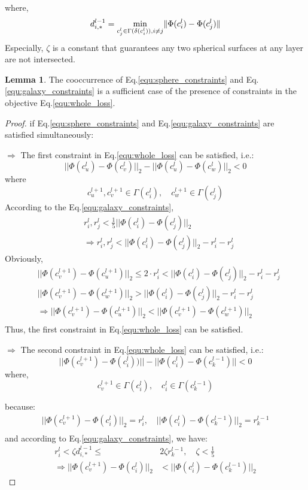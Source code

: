 \documentclass{article}
\theoremstyle{definition}
\newtheorem{lem}{Lemma}
\begin{document}
	 where,
	 \[
	 	d_{i,*}^{l-1} = \min_{c^{l}_j \in \Gamma(\delta(c^{l}_i)), i \neq j} \lVert\Phi(c_i^{l}) - \Phi(c_j^{l})\rVert \\
	 \]
	 Especially, $\zeta$ is a constant that guarantees any two spherical surfaces at any layer are not intersected.

	 \begin{lem}
	 \label{lem:constraints}
	 The cooccurrence of Eq.\ref{equ:sphere_constraints} and Eq.\ref{equ:galaxy_constraints} is a sufficient case of the presence of constraints in the objective Eq.\ref{equ:whole_loss}.
	 \end{lem}
	 \begin{proof}
	 	if Eq.\ref{equ:sphere_constraints} and Eq.\ref{equ:galaxy_constraints} are satisfied simultaneously:

	 	$\Rightarrow$ The first constraint in Eq.\ref{equ:whole_loss} can be satisfied, i.e.:
	 	\[
	 		|| \Phi(c_u^l) - \Phi(c_v^l) ||_2 - ||\Phi(c_u^l) - \Phi(c_w^l)||_2 < 0 	
	 	\]
	 	where 
	 	\[
	 		c_u^{l+1}, c_v^{l+1} \in \Gamma{(c_i^l)}, \quad c_w^{l+1} \in \Gamma{(c_j^l)}
	 	\]
	 	According to the Eq.\ref{equ:galaxy_constraints},
	 \[
	 	\begin{split}
	 	&r_i^l, r_j^l < \frac{1}{5}||\Phi(c_i^{l}) - \Phi(c_j^{l})||_2 \\
	 	&\Rightarrow r_i^l, r_j^l < ||\Phi(c_i^{l}) - \Phi(c_j^{l})||_2-r_i^l-r_j^l
	 	\end{split}
	 \]
	 Obviously,
	 \[
	 \begin{split}
	 &||\Phi(c_v^{l+1}) - \Phi(c_u^{l+1})||_2 \le 2 \cdot r_i^l < ||\Phi(c_i^{l}) - \Phi(c_j^{l})||_2-r_i^l-r_j^l \\
	 &||\Phi(c_v^{l+1}) - \Phi(c_w^{l+1})||_2 > ||\Phi(c_i^{l}) - \Phi(c_j^{l})||_2-r_i^l-r_j^l\\
	 &\Rightarrow ||\Phi(c_v^{l+1}) - \Phi(c_u^{l+1})||_2 < ||\Phi(c_v^{l+1}) - \Phi(c_w^{l+1})||_2\\
	 \end{split}
	 \]
	 Thus, the first constraint in Eq.\ref{equ:whole_loss} can be satisfied.

	 $\Rightarrow$ The second constraint in Eq.\ref{equ:whole_loss} can be satisfied, i.e.:
	 \[
	 	|| \Phi(c_v^{l+1}) - \Phi(c_i^{l})) || - ||\Phi(c_i^{l}) - \Phi(c_k^{l - 1})|| < 0
	 \]
	 where, 
	 \[
	 	c_v^{l+1} \in \Gamma{(c_i^l)}, \quad c_i^l \in \Gamma(c_k^{l-1})
	 \]

	 because:
	 \[
	 	\begin{split}
				||\Phi(c_v^{l+1}) - \Phi(c_i^{l})||_2 = r_i^l, \quad ||\Phi(c_i^{l}) - \Phi(c_k^{l-1})||_2 = r_k^{l-1}\\ 
		\end{split}	
	 \]
	 and according to Eq.\ref{equ:galaxy_constraints}, we have:
	 \[
	 	\begin{split}
	 		r_i^l < \zeta d_{i, *}^{l-1} \le &2\zeta r_k^{l-1}, \quad \zeta < \frac{1}{5} \\
	 		\Rightarrow ||\Phi(c_v^{l+1}) - \Phi(c_i^{l})||_2 &< ||\Phi(c_i^{l}) - \Phi(c_k^{l-1})||_2
	 	\end{split}
	 \]


\end{proof}
\end{document}
